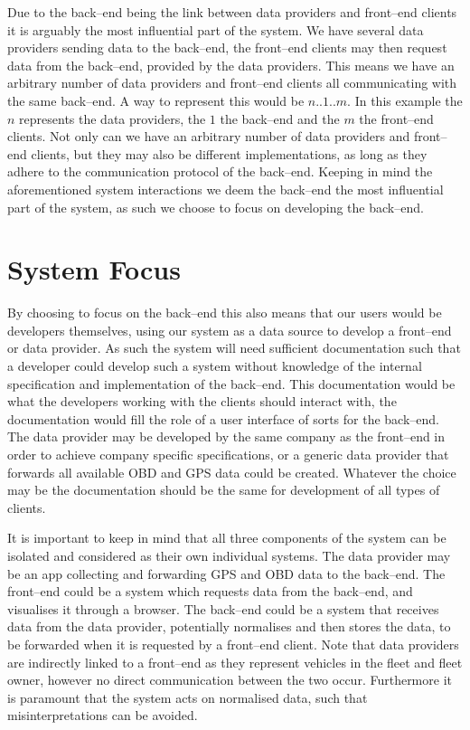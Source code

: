 \bigskip
Due to the back--end being the link between data providers and front--end clients it is arguably the most influential part of the system.
We have several data providers sending data to the back--end, the front--end clients may then request data from the back--end, provided by the data providers.
This means we have an arbitrary number of data providers and front--end clients all communicating with the same back--end.
A way to represent this would be $n..1..m$.
In this example the $n$ represents the data providers, the $1$ the back--end and the $m$ the front--end clients.
Not only can we have an arbitrary number of data providers and front--end clients, but they may also be different implementations, as long as they adhere to the communication protocol of the back--end.
Keeping in mind the aforementioned system interactions we deem the back--end the most influential part of the system, as such we choose to focus on developing the back--end.

\section{System Focus}
By choosing to focus on the back--end this also means that our users would be developers themselves, using our system as a data source to develop a front--end or data provider.
As such the system will need sufficient documentation such that a developer could develop such a system without knowledge of the internal specification and implementation of the back--end.
This documentation would be what the developers working with the clients should interact with, the documentation would fill the role of a user interface of sorts for the back--end.
The data provider may be developed by the same company as the front--end in order to achieve company specific specifications, or a generic data provider that forwards all available \ac{OBD} and GPS data could be created.
Whatever the choice may be the documentation should be the same for development of all types of clients.

It is important to keep in mind that all three components of the system can be isolated and considered as their own individual systems.
The data provider may be an app collecting and forwarding GPS and \ac{OBD} data to the back--end.
The front--end could be a system which requests data from the back--end, and visualises it through a browser.
The back--end could be a system that receives data from the data provider, potentially normalises and then stores the data, to be forwarded when it is requested by a front--end client.
Note that data providers are indirectly linked to a front--end as they represent vehicles in the fleet and fleet owner, however no direct communication between the two occur.
Furthermore it is paramount that the system acts on normalised data, such that misinterpretations can be avoided.

